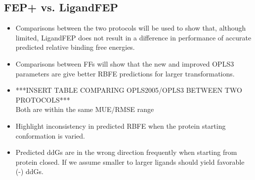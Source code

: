 \documentclass{article}
\begin{document}
\subsection{FEP+ vs. LigandFEP}
   \begin{itemize}
   \item Comparisons between the two protocols will be used to show that, although limited, LigandFEP does not result in a difference in performance of accurate predicted relative binding free energies.
   \item Comparisons between FFs will show that the new and improved OPLS3 parameters are give better RBFE predictions for larger transformations.
   \item ***INSERT TABLE COMPARING OPLS2005/OPLS3 BETWEEN TWO PROTOCOLS***
      \\ Both are within the same MUE/RMSE range
   \item Highlight inconsistency in predicted RBFE when the protein starting conformation is varied.
   \item Predicted ddGs are in the wrong direction frequently when starting from protein closed. If we assume smaller to larger ligands should yield favorable (-) ddGs.
   \end{itemize}
\end{document}

